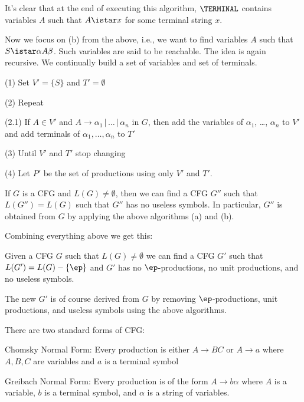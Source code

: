 It's clear that at the end of executing this algorithm, $\TERMINAL$
contains variables $A$ such that $A \istar x$ for some terminal
string $x$.

Now we focus on (b) from the above, i.e., we want to find
variables $A$ such that $S \istar \alpha A \beta$. Such variables
are said to be reachable. The idea is again recursive. We
continually build a set of variables and set of terminals.

\begin{mylist}
 \item[(1)] Set $V' = \{S\}$ and $T' = \emptyset$
 \item[(2)] Repeat
 \begin{mylist}
  \item[(2.1)] If $A \in V'$ and $A \rightarrow \alpha_1\,|\,
  \ldots \,|\, \alpha_n$ in $G$, then
   add the variables of
   $\alpha_1$, \ldots, $\alpha_n$ to $V'$ and add terminals of
   $\alpha_1, \ldots, \alpha_n$ to $T'$
 \end{mylist}
 \item[(3)] Until $V'$ and $T'$ stop changing
 \item[(4)] Let $P'$ be the set of productions using only $V'$
 and $T'$.
\end{mylist}

\begin{thm}
If $G$ is a CFG and $L(G) \neq \emptyset$, then we can find a CFG
$G''$ such that $L(G'') = L(G)$ such that $G''$ has no useless
symbols. In particular, $G''$ is obtained from $G$ by applying the
above algorithms (a) and (b).
\end{thm}

Combining everything above we get this:

\begin{thm}
Given a CFG $G$ such that $L(G) \neq \emptyset$ we can find a CFG
$G'$ such that $L(G') = L(G) - \{\ep\}$ and $G'$ has no
$\ep$-productions, no unit productions, and no useless symbols.
\end{thm}

The new $G'$ is of course derived from $G$ by removing
$\ep$-productions, unit productions, and useless symbols using the
above algorithms.

There are two standard forms of CFG:
\begin{mylist}
 \item Chomsky Normal Form: Every production is either $A
 \rightarrow BC$ or $A \rightarrow a$ where $A,B,C$ are variables
 and $a$ is a terminal symbol
 \item Greibach Normal Form: Every production is of the form $A
 \rightarrow b\alpha$ where $A$ is a variable, $b$ is a terminal
 symbol, and $\alpha$ is a string of variables.
\end{mylist}
